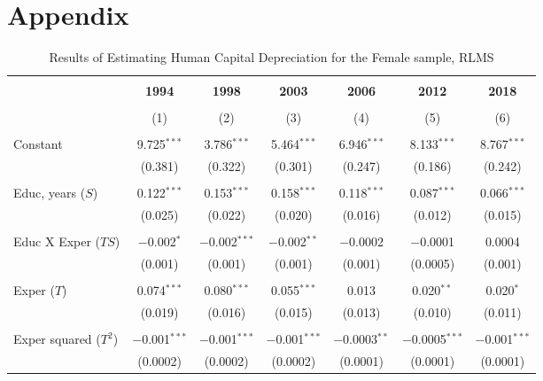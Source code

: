 \documentclass[alpha-refs]{wiley-article-04t}
\begin{document}
\newpage
\section*{Appendix}
%

\setcounter{table}{0}
\renewcommand{\thetable}{A\arabic{table}}


\begin{table}[!htbp] \centering 
\caption{Results of Estimating Human Capital Depreciation for the Female sample, RLMS} 
	\label{tab:A1}
\begin{tabular}{@{\extracolsep{5pt}}lcccccc} 
\\[-1.8ex]\hline 
\hline \\[-1.8ex] 
& \textbf{1994} & \textbf{1998} & \textbf{2003} & \textbf{2006} & \textbf{2012} & \textbf{2018} \\ 
\\[-1.8ex] & (1) & (2) & (3) & (4) & (5) & (6)\\ 
\hline \\[-1.8ex] 
 Constant & 9.725$^{***}$ & 3.786$^{***}$ & 5.464$^{***}$ & 6.946$^{***}$ & 8.133$^{***}$ & 8.767$^{***}$ \\ 
  & (0.381) & (0.322) & (0.301) & (0.247) & (0.186) & (0.242) \\ 
  & & & & & & \\ 
 Educ, years ($S$) & 0.122$^{***}$ & 0.153$^{***}$ & 0.158$^{***}$ & 0.118$^{***}$ & 0.087$^{***}$ & 0.066$^{***}$ \\ 
  & (0.025) & (0.022) & (0.020) & (0.016) & (0.012) & (0.015) \\ 
  & & & & & & \\ 
 Educ X Exper ($TS$) & $-$0.002$^{*}$ & $-$0.002$^{***}$ & $-$0.002$^{**}$ & $-$0.0002 & $-$0.0001 & 0.0004 \\ 
  & (0.001) & (0.001) & (0.001) & (0.001) & (0.0005) & (0.001) \\ 
  & & & & & & \\ 
 Exper ($T$) & 0.074$^{***}$ & 0.080$^{***}$ & 0.055$^{***}$ & 0.013 & 0.020$^{**}$ & 0.020$^{*}$ \\ 
  & (0.019) & (0.016) & (0.015) & (0.013) & (0.010) & (0.011) \\ 
  & & & & & & \\ 
 Exper squared ($T^2$) & $-$0.001$^{***}$ & $-$0.001$^{***}$ & $-$0.001$^{***}$ & $-$0.0003$^{**}$ & $-$0.0005$^{***}$ & $-$0.001$^{***}$ \\ 
  & (0.0002) & (0.0002) & (0.0002) & (0.0001) & (0.0001) & (0.0001) \\ 

\end{tabular}
\end{table}
\end{document}
